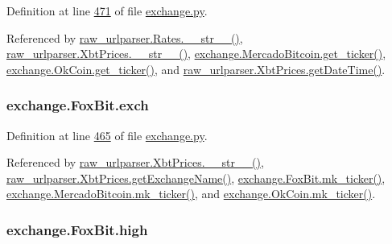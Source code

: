 Definition at line \hyperlink{exchange_8py_source_l00471}{471} of file \hyperlink{exchange_8py_source}{exchange.\+py}.



Referenced by \hyperlink{raw__urlparser_8py_source_l00038}{raw\+\_\+urlparser.\+Rates.\+\_\+\+\_\+str\+\_\+\+\_\+()}, \hyperlink{raw__urlparser_8py_source_l00074}{raw\+\_\+urlparser.\+Xbt\+Prices.\+\_\+\+\_\+str\+\_\+\+\_\+()}, \hyperlink{exchange_8py_source_l00543}{exchange.\+Mercado\+Bitcoin.\+get\+\_\+ticker()}, \hyperlink{exchange_8py_source_l00608}{exchange.\+Ok\+Coin.\+get\+\_\+ticker()}, and \hyperlink{raw__urlparser_8py_source_l00059}{raw\+\_\+urlparser.\+Xbt\+Prices.\+get\+Date\+Time()}.

\subsubsection[{\texorpdfstring{exch}{exch}}]{\setlength{\rightskip}{0pt plus 5cm}exchange.\+Fox\+Bit.\+exch}\hypertarget{classexchange_1_1_fox_bit_a3922433dcfe54e39c3c0da12fa252658}{}\label{classexchange_1_1_fox_bit_a3922433dcfe54e39c3c0da12fa252658}


Definition at line \hyperlink{exchange_8py_source_l00465}{465} of file \hyperlink{exchange_8py_source}{exchange.\+py}.



Referenced by \hyperlink{raw__urlparser_8py_source_l00074}{raw\+\_\+urlparser.\+Xbt\+Prices.\+\_\+\+\_\+str\+\_\+\+\_\+()}, \hyperlink{raw__urlparser_8py_source_l00068}{raw\+\_\+urlparser.\+Xbt\+Prices.\+get\+Exchange\+Name()}, \hyperlink{exchange_8py_source_l00482}{exchange.\+Fox\+Bit.\+mk\+\_\+ticker()}, \hyperlink{exchange_8py_source_l00557}{exchange.\+Mercado\+Bitcoin.\+mk\+\_\+ticker()}, and \hyperlink{exchange_8py_source_l00622}{exchange.\+Ok\+Coin.\+mk\+\_\+ticker()}.

\subsubsection[{\texorpdfstring{high}{high}}]{\setlength{\rightskip}{0pt plus 5cm}exchange.\+Fox\+Bit.\+high}\hypertarget{classexchange_1_1_fox_bit_a4f6dfaecbcc17ceadddf52d266d9c00d}{}\label{classexchange_1_1_fox_bit_a4f6dfaecbcc17ceadddf52d266d9c00d}


